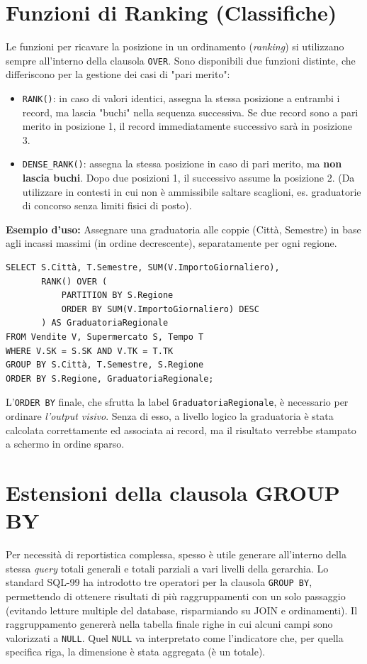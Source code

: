 \section{Funzioni di Ranking (Classifiche)}
Le funzioni per ricavare la posizione in un ordinamento (\textit{ranking}) si utilizzano sempre all'interno della clausola \texttt{OVER}. Sono disponibili due funzioni distinte, che differiscono per la gestione dei casi di "pari merito":
\begin{itemize}
    \item \texttt{RANK()}: in caso di valori identici, assegna la stessa posizione a entrambi i record, ma lascia "buchi" nella sequenza successiva. Se due record sono a pari merito in posizione 1, il record immediatamente successivo sarà in posizione 3.
    \item \texttt{DENSE\_RANK()}: assegna la stessa posizione in caso di pari merito, ma \textbf{non lascia buchi}. Dopo due posizioni 1, il successivo assume la posizione 2. (Da utilizzare in contesti in cui non è ammissibile saltare scaglioni, es. graduatorie di concorso senza limiti fisici di posto).
\end{itemize}

\textbf{Esempio d'uso:} Assegnare una graduatoria alle coppie (Città, Semestre) in base agli incassi massimi (in ordine decrescente), separatamente per ogni regione.
\begin{verbatim}
SELECT S.Città, T.Semestre, SUM(V.ImportoGiornaliero),
       RANK() OVER (
           PARTITION BY S.Regione 
           ORDER BY SUM(V.ImportoGiornaliero) DESC
       ) AS GraduatoriaRegionale
FROM Vendite V, Supermercato S, Tempo T
WHERE V.SK = S.SK AND V.TK = T.TK
GROUP BY S.Città, T.Semestre, S.Regione
ORDER BY S.Regione, GraduatoriaRegionale;
\end{verbatim}
L'\texttt{ORDER BY} finale, che sfrutta la label \texttt{GraduatoriaRegionale}, è necessario per ordinare \textit{l'output visivo}. Senza di esso, a livello logico la graduatoria è stata calcolata correttamente ed associata ai record, ma il risultato verrebbe stampato a schermo in ordine sparso.

\section{Estensioni della clausola GROUP BY}
Per necessità di reportistica complessa, spesso è utile generare all'interno della stessa \textit{query} totali generali e totali parziali a vari livelli della gerarchia. Lo standard SQL-99 ha introdotto tre operatori per la clausola \texttt{GROUP BY}, permettendo di ottenere risultati di più raggruppamenti con un solo passaggio (evitando letture multiple del database, risparmiando su JOIN e ordinamenti).
Il raggruppamento genererà nella tabella finale righe in cui alcuni campi sono valorizzati a \texttt{NULL}. Quel \texttt{NULL} va interpretato come l'indicatore che, per quella specifica riga, la dimensione è stata aggregata (è un totale).

